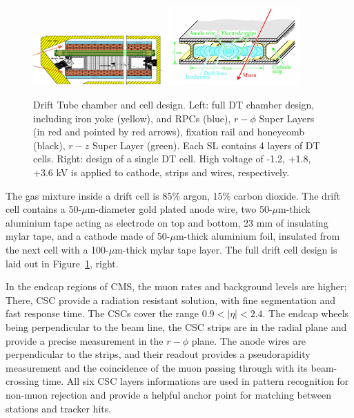 \begin{figure}[htb]
  \begin{center}
    \includegraphics[width=0.45\textwidth]{Chapters/xLHCMS/DTchamber.png}
    \includegraphics[width=0.45\textwidth]{Chapters/xLHCMS/DTcell.png}
    \caption{Drift Tube chamber and cell design. Left: full DT chamber
    design, including iron yoke (yellow), and RPCs
    (blue), $r-\phi$ Super Layers (in red and pointed by red arrows),
    fixation rail and honeycomb (black), $r-z$ Super Layer
    (green). Each SL contains 4 layers of DT cells. Right: design of a
    single DT cell. High voltage of -1.2, +1.8, +3.6 kV is applied to
    cathode, strips and wires, respectively.}
    \label{fig:DTchamber}
  \end{center}
\end{figure}

The gas mixture inside a drift cell is 85\% argon, 15\% carbon
dioxide. The drift cell contains a 50-$\mu$m-diameter gold plated
anode wire, two 50-$\mu$m-thick aluminium tape acting as electrode on
top and bottom, 23
mm of insulating mylar tape, and a cathode made of 50-$\mu$m-thick
aluminium foil, insulated from the next cell with a 100-$\mu$m-thick
mylar tape layer. The full drift cell design is laid out in
Figure~\ref{fig:DTchamber}, right.


In the endcap regions of CMS, the muon rates and background levels are
higher; There, CSC provide a radiation resistant solution, with fine
segmentation and fast response time. The CSCs cover the range
$0.9 < \vert\eta\vert < 2.4$. The endcap wheels being perpendicular to
the beam line, the CSC strips are in the radial plane and provide a
precise measurement in the $r-\phi$ plane.  The anode wires are
perpendicular to the strips, and their readout provides a
pseudorapidity measurement and the coincidence of the muon passing
through with its beam-crossing time. All six CSC layers informations
are used in pattern recognition for non-muon rejection and provide a
helpful anchor point for matching between stations and tracker hits.

